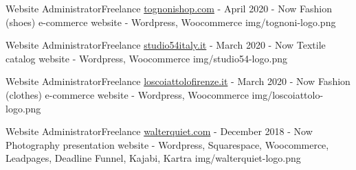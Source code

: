 
\begin{cventries}

  \logocventry
    {Website Administrator{\enskip\cdotp\enskip}Freelance}
    {\href{https://www.tognonishop.com}{tognonishop.com}}
    {-}
    {April 2020 - Now}
    {
      \cvexp
        {Fashion (shoes) e-commerce website}
        {-}
        {Wordpress, Woocommerce}
    }
    {img/tognoni-logo.png}

  \logocventry
    {Website Administrator{\enskip\cdotp\enskip}Freelance}
    {\href{https://www.studio54italy.it}{studio54italy.it}}
    {-}
    {March 2020 - Now}
    {
      \cvexp
        {Textile catalog website}
        {-}
        {Wordpress, Woocommerce}
    }
    {img/studio54-logo.png}

  \logocventry
    {Website Administrator{\enskip\cdotp\enskip}Freelance}
    {\href{https://www.loscoiattolofirenze.it}{loscoiattolofirenze.it}}
    {-}
    {March 2020 - Now}
    {
      \cvexp
        {Fashion (clothes) e-commerce website}
        {-}
        {Wordpress, Woocommerce}
    }
    {img/loscoiattolo-logo.png}

  \logocventry
    {Website Administrator{\enskip\cdotp\enskip}Freelance}
    {\href{https://www.walterquiet.com}{walterquiet.com}}
    {-}
    {December 2018 - Now}
    {
      \cvexp
        {Photography presentation website}
        {-}
        {Wordpress, Squarespace, Woocommerce, Leadpages, Deadline Funnel, Kajabi, Kartra}
    }
    {img/walterquiet-logo.png}

\end{cventries}
